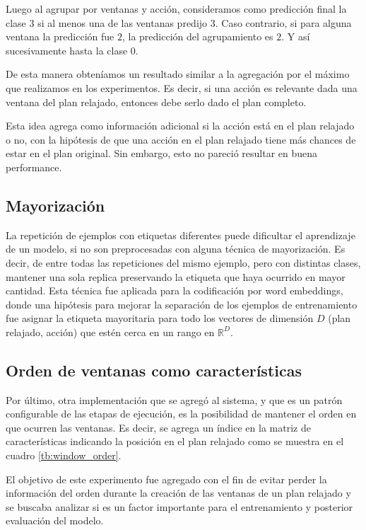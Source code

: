 Luego al agrupar por ventanas y acción, consideramos como predicción final la
clase $3$ si al menos una de las ventanas predijo $3$. Caso contrario, si para
alguna ventana la predicción fue $2$, la predicción del agrupamiento es $2$. Y así
sucesivamente hasta la clase $0$.

De esta manera obteníamos un resultado similar a la agregación por el máximo que
realizamos en los experimentos. Es decir, si una acción es relevante dada una
ventana del plan relajado, entonces debe serlo dado el plan completo.

Esta idea agrega como información adicional si la acción está en el plan
relajado o no, con la hipótesis de que una acción en el plan relajado tiene más
chances de estar en el plan original. Sin embargo, esto no pareció resultar en
buena performance.

\subsection{Mayorización}

La repetición de ejemplos con etiquetas diferentes puede dificultar el
aprendizaje de un modelo, si no son preprocesadas con alguna técnica de
mayorización. Es decir, de entre todas las repeticiones del mismo ejemplo, pero
con distintas clases, mantener una sola replica preservando la etiqueta que haya
ocurrido en mayor cantidad. Esta técnica fue aplicada para la codificación por
word embeddings, donde una hipótesis para mejorar la separación de los ejemplos
de entrenamiento fue asignar la etiqueta mayoritaria para todo los vectores de
dimensión $D$ (plan relajado, acción) que estén cerca en un rango en
$\mathbb{R}^{D}$.

\subsection{Orden de ventanas como características}

Por último, otra implementación que se agregó al sistema, y que es un patrón
configurable de las etapas de ejecución, es la posibilidad de mantener el orden
en que ocurren las ventanas. Es decir, se agrega un índice en la matriz de
características indicando la posición en el plan relajado como se muestra en el
cuadro \ref{tb:window_order}.

\begin{table}[h!]
\centering
{}
 \caption{Ejemplos etiquetados a partir de un plan relajado y una acción.}
 \label{tb:window_order}
\end{table}

El objetivo de este experimento fue agregado con el fin de evitar perder la
información del orden durante la creación de las ventanas de un plan relajado y
se buscaba analizar si es un factor importante para el entrenamiento y posterior
evaluación del modelo.